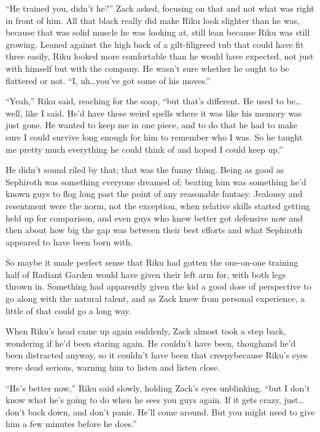 ``He trained you, didn't he?'' Zack asked, focusing on that and not what was right in front of him. All that black really did make Riku look slighter than he was, because that was solid muscle he was looking at, still lean because Riku was still growing. Leaned against the high back of a gilt-filigreed tub that could have fit three easily, Riku looked more comfortable than he would have expected, not just with himself but with the company. He wasn't sure whether he ought to be flattered or not. ``I, uh\ldots you've got some of his moves.''

``Yeah,'' Riku said, reaching for the soap, ``but that's different. He used to be\ldots well, like I said. He'd have these weird spells where it was like his memory was just gone. He wanted to keep me in one piece, and to do that he had to make sure I could survive long enough for him to remember who I was. So he taught me pretty much everything he could think of and hoped I could keep up.''

He didn't sound riled by that; that was the funny thing. Being as good as Sephiroth was something everyone dreamed of; beating him was something he'd known guys to flog long past the point of any reasonable fantasy. Jealousy and resentment were the norm, not the exception, when relative skills started getting held up for comparison, and even guys who knew better got defensive now and then about how big the gap was between their best efforts and what Sephiroth appeared to have been born with.

So maybe it made perfect sense that Riku had gotten the one-on-one training half of Radiant Garden would have given their left arm for, with both legs thrown in. Something had apparently given the kid a good dose of perspective to go along with the natural talent, and as Zack knew from personal experience, a little of that could go a long way.

When Riku's head came up again suddenly, Zack almost took a step back, wondering if he'd been staring again. He couldn't have been, though\textemdash and he'd been distracted anyway, so it couldn't have been that creepy\textemdash because Riku's eyes were dead serious, warning him to listen and listen close.

``He's better now,'' Riku said slowly, holding Zack's eyes unblinking, ``but I don't know what he's going to do when he sees you guys again. If it gets crazy, just\ldots don't back down, and don't panic. He'll come around. But you might need to give him a few minutes before he does.''

